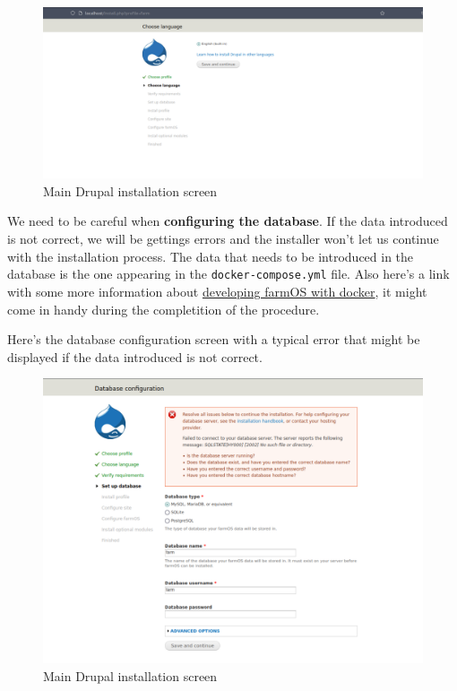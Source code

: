 \begin{figure}[H]
    \centering
    \includegraphics[width=1\textwidth]{fig/drupal-install/farmos-drupal-install.png}
    \caption{Main Drupal installation screen}
    \label{fig:farmos-drupal-install}
\end{figure}

We need to be careful when \textbf{configuring the database}. If the data introduced is not correct, we will be gettings errors and the installer won't let us continue with the installation process.
The data that needs to be introduced in the database is the one appearing in the \verb|docker-compose.yml| file. Also here's a link with some more information about \href{https://farmos.org/development/docker/}{developing farmOS with docker}, it might come in handy during the completition of the procedure.

Here's the database configuration screen with a typical error that might be displayed if the data introduced is not correct.
\begin{figure}[H]
    \centering
    \includegraphics[width=1\textwidth]{fig/drupal-install/db-config-drupal.png}
    \caption{Main Drupal installation screen}
    \label{fig:db-config-drupal}
\end{figure}

